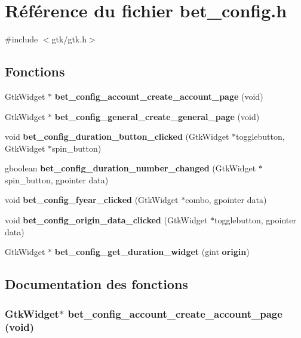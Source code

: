 \section{Référence du fichier bet\_\-config.h}
\label{bet__config_8h}
{\ttfamily \#include $<$gtk/gtk.h$>$}\par
\subsection*{Fonctions}
\begin{DoxyCompactItemize}
\item 
GtkWidget $\ast$ {\bf bet\_\-config\_\-account\_\-create\_\-account\_\-page} (void)
\item 
GtkWidget $\ast$ {\bf bet\_\-config\_\-general\_\-create\_\-general\_\-page} (void)
\item 
void {\bf bet\_\-config\_\-duration\_\-button\_\-clicked} (GtkWidget $\ast$togglebutton, GtkWidget $\ast$spin\_\-button)
\item 
gboolean {\bf bet\_\-config\_\-duration\_\-number\_\-changed} (GtkWidget $\ast$spin\_\-button, gpointer data)
\item 
void {\bf bet\_\-config\_\-fyear\_\-clicked} (GtkWidget $\ast$combo, gpointer data)
\item 
void {\bf bet\_\-config\_\-origin\_\-data\_\-clicked} (GtkWidget $\ast$togglebutton, gpointer data)
\item 
GtkWidget $\ast$ {\bf bet\_\-config\_\-get\_\-duration\_\-widget} (gint {\bf origin})
\end{DoxyCompactItemize}


\subsection{Documentation des fonctions}
\subsubsection[{bet\_\-config\_\-account\_\-create\_\-account\_\-page}]{\setlength{\rightskip}{0pt plus 5cm}GtkWidget$\ast$ bet\_\-config\_\-account\_\-create\_\-account\_\-page (void)}\label{bet__config_8h_abeafee7e6cbd8bdf2c9f6f93ef24a964}


